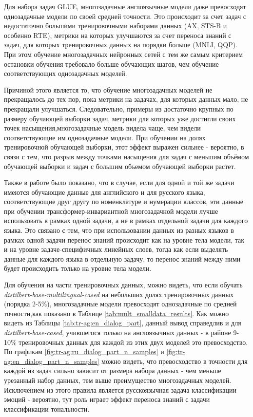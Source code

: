 Для набора задач GLUE, многозадачные англоязычные модели даже превосходят однозадачные модели по своей средней точности. Это происходит за счет задач с недостаточно большими тренировочными наборами данных (AX, STS-B и особенно RTE), метрики на которых улучшаются за счет переноса знаний с задач, для которых тренировочных данных на порядки больше (MNLI, QQP).
При этом обучение многозадачных нейронных сетей с тем же самым критерием остановки обучения требовало больше обучающих шагов, чем обучение соответствующих однозадачных моделей.

Причиной этого является то, что обучение многозадачных моделей не прекращалось до тех пор, пока метрики на задачах, для которых данных мало, не прекращали улучшаться.
Следовательно, примеры из достаточно крупных по размеру обучающей выборки задач, метрики для которых уже достигли своих точек насыщения,многозадачные модель видела чаще, чем видели соответствующие им однозадачные модели. При обучении на долях тренировочной обучающей выборки, этот эффект выражен сильнее - вероятно, в связи с тем, что разрыв между точками насыщения для задач с меньшим объёмом обучающей выборки и задач с большим объемом обучающей выборки растет.

Также в работе было показано, что в случае, если для одной и той же задачи имеются обучающие данные для английского и для русского языка, соответствующие друг другу по номенклатуре и нумерации классов, эти данные при обучении трансформер-инвариантной многозадачной модели лучше использовать в рамках одной задачи, а не в рамках отдельной задачи для каждого языка. Это связано с тем, что при использовании данных из разных языков в рамках одной задачи перенос знаний происходит как на уровне тела модели, так и на уровне задаче-специфичных линейных слоев, тогда как если выделять данные для каждого языка в отдельную задачу, то перенос знаний между ними будет происходить только на уровне тела модели.

Для обучения на части тренировочных данных, можно видеть, что если обучать \textit{distilbert-base-multilingual-cased} на небольших долях тренировочных данных (порядка 2-5\%), многозадачные модели превосходят однозадачные по средней точности,как показано в Таблице \ref{tab:mult_smalldata_results}. Как можно видеть из Таблицы \ref{tab:tr-ag:en_dialog_part}, данный вывод справедлив и для \textit{distilbert-base-cased}, учившегося только на англоязычных данных - в районе 9-10\% тренировочных данных для каждой из этих двух моделей это превосходство. По графикам \ref{fig:tr-ag:ru_dialog_part_n_samples} и \ref{fig:tr-ag:en_dialog_part_n_samples} можно видеть, что превосходство в точности для каждой из задач сильно зависит от размера набора данных - чем меньше урезанный набор данных, тем выше преимущество многозадачных моделей. Исключением из этого правила является русскоязычная задача классификации эмоций - вероятно, тут роль играет эффект переноса знаний с задачи классификации тональности.

